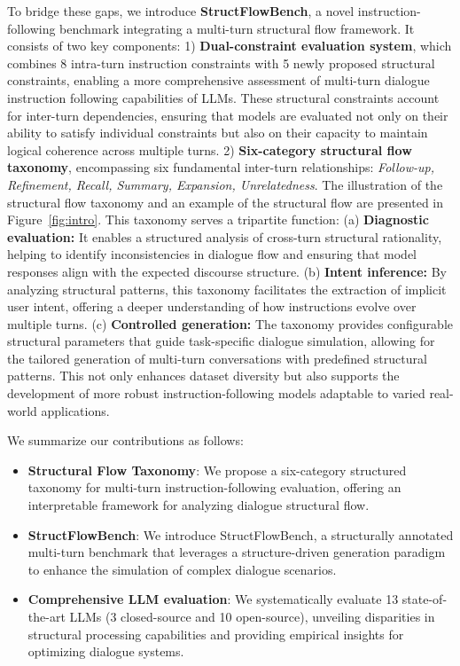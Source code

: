 To bridge these gaps, we introduce \textbf{StructFlowBench}, a novel instruction-following benchmark integrating a multi-turn structural flow framework. 
It consists of two key components: 1) \textbf{Dual-constraint evaluation system}, which combines 8 intra-turn instruction constraints with 5 newly proposed structural constraints, enabling a more comprehensive assessment of multi-turn dialogue instruction following capabilities of LLMs. 
These structural constraints account for inter-turn dependencies, ensuring that models are evaluated not only on their ability to satisfy individual constraints but also on their capacity to maintain logical coherence across multiple turns.
2) \textbf{Six-category structural flow taxonomy}, encompassing six fundamental inter-turn relationships: \textit{Follow-up, Refinement, Recall, Summary, Expansion, Unrelatedness}.
The illustration of the structural flow taxonomy and an example of the structural flow are presented in Figure~\ref{fig:intro}.
This taxonomy serves a tripartite function: (a) \textbf{Diagnostic evaluation:} It enables a structured analysis of cross-turn structural rationality, helping to identify inconsistencies in dialogue flow and ensuring that model responses align with the expected discourse structure.
(b) \textbf{Intent inference:} By analyzing structural patterns, this taxonomy facilitates the extraction of implicit user intent, offering a deeper understanding of how instructions evolve over multiple turns.
(c) \textbf{Controlled generation:} The taxonomy provides configurable structural parameters that guide task-specific dialogue simulation, allowing for the tailored generation of multi-turn conversations with predefined structural patterns.
This not only enhances dataset diversity but also supports the development of more robust instruction-following models adaptable to varied real-world applications.

We summarize our contributions as follows: 
\vspace{-.1in}
\begin{itemize}
    \setlength{\itemsep}{0pt}
    \setlength{\parskip}{0pt}
    \item \textbf{Structural Flow Taxonomy}: We propose a six-category structured taxonomy for multi-turn instruction-following evaluation, offering an interpretable framework for analyzing dialogue structural flow.
    \item \textbf{StructFlowBench}: We introduce StructFlowBench, a structurally annotated multi-turn benchmark that leverages a structure-driven generation paradigm to enhance the simulation of complex dialogue scenarios.
    \item \textbf{Comprehensive LLM evaluation}: We systematically evaluate 13 state-of-the-art LLMs (3 closed-source and 10 open-source), unveiling disparities in structural processing capabilities and providing empirical insights for optimizing dialogue systems.
\end{itemize}

